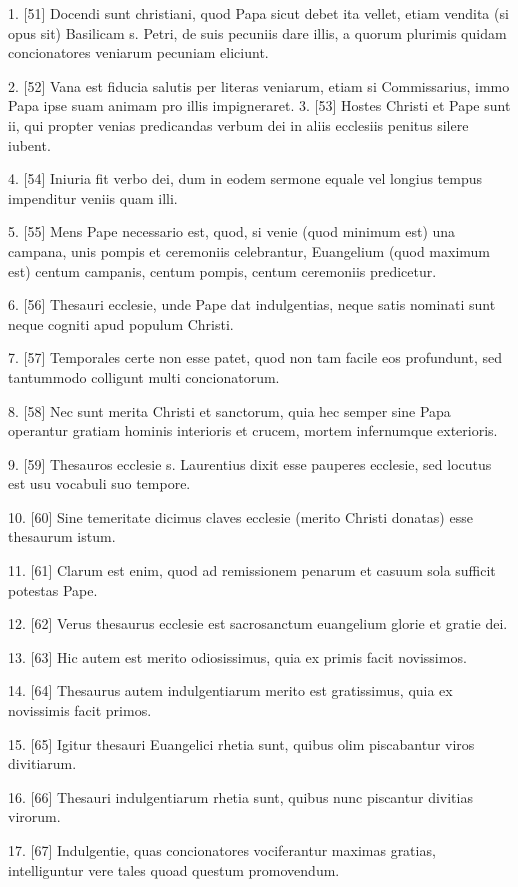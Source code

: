 1. [51] Docendi sunt christiani, quod Papa sicut debet ita vellet,
etiam vendita (si opus sit) Basilicam s. Petri, de suis pecuniis dare
illis, a quorum plurimis quidam concionatores veniarum pecuniam
eliciunt.

2. [52] Vana est fiducia salutis per literas veniarum, etiam si
Commissarius, immo Papa ipse suam animam pro illis impigneraret. 3.
[53] Hostes Christi et Pape sunt ii, qui propter venias predicandas
verbum dei in aliis ecclesiis penitus silere iubent.

4. [54] Iniuria fit verbo dei, dum in eodem sermone equale vel longius
tempus impenditur veniis quam illi.

5. [55] Mens Pape necessario est, quod, si venie (quod minimum est) una
campana, unis pompis et ceremoniis celebrantur, Euangelium (quod
maximum est) centum campanis, centum pompis, centum ceremoniis
predicetur.

6. [56] Thesauri ecclesie, unde Pape dat indulgentias, neque satis
nominati sunt neque cogniti apud populum Christi.

7. [57] Temporales certe non esse patet, quod non tam facile eos
profundunt, sed tantummodo colligunt multi concionatorum.

8. [58] Nec sunt merita Christi et sanctorum, quia hec semper sine Papa
operantur gratiam hominis interioris et crucem, mortem infernumque
exterioris.

9. [59] Thesauros ecclesie s. Laurentius dixit esse pauperes ecclesie,
sed locutus est usu vocabuli suo tempore.

10. [60] Sine temeritate dicimus claves ecclesie (merito Christi
donatas) esse thesaurum istum.

11. [61] Clarum est enim, quod ad remissionem penarum et casuum sola
sufficit potestas Pape.

12. [62] Verus thesaurus ecclesie est sacrosanctum euangelium glorie et
gratie dei.

13. [63] Hic autem est merito odiosissimus, quia ex primis facit
novissimos.

14. [64] Thesaurus autem indulgentiarum merito est gratissimus, quia ex
novissimis facit primos.

15. [65] Igitur thesauri Euangelici rhetia sunt, quibus olim
piscabantur viros divitiarum.

16. [66] Thesauri indulgentiarum rhetia sunt, quibus nunc piscantur
divitias virorum.

17. [67] Indulgentie, quas concionatores vociferantur maximas gratias,
intelliguntur vere tales quoad questum promovendum.

